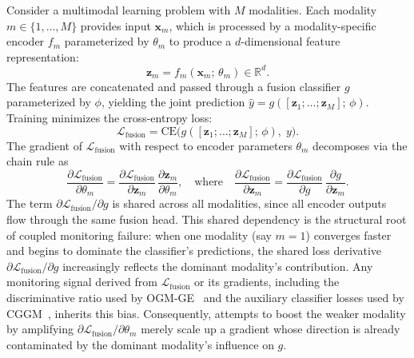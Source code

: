 \documentclass{article}
\newcommand{\loss}{\mathcal{L}}
\newcommand{\encoder}{f}
\begin{document}
Consider a multimodal learning problem with $M$ modalities. Each modality $m \in \{1,\ldots,M\}$ provides input $\mathbf{x}_m$, which is processed by a modality-specific encoder $\encoder_m$ parameterized by $\theta_m$ to produce a $d$-dimensional feature representation:
%
\begin{equation}
\label{eq:encoder}
\mathbf{z}_m = \encoder_m(\mathbf{x}_m;\,\theta_m) \in \mathbb{R}^d.
\end{equation}
%
The features are concatenated and passed through a fusion classifier $g$ parameterized by $\phi$, yielding the joint prediction $\hat{y} = g([\mathbf{z}_1;\ldots;\mathbf{z}_M];\,\phi)$. Training minimizes the cross-entropy loss:
%
\begin{equation}
\label{eq:joint_loss}
\loss_{\text{fusion}} = \mathrm{CE}\!\bigl(g([\mathbf{z}_1;\ldots;\mathbf{z}_M];\,\phi),\; y\bigr).
\end{equation}
%
The gradient of $\loss_{\text{fusion}}$ with respect to encoder parameters $\theta_m$ decomposes via the chain rule as
%
\begin{equation}
\label{eq:gradient_chain}
\frac{\partial \loss_{\text{fusion}}}{\partial \theta_m}
= \frac{\partial \loss_{\text{fusion}}}{\partial \mathbf{z}_m}\,\frac{\partial \mathbf{z}_m}{\partial \theta_m},
\quad\text{where}\quad
\frac{\partial \loss_{\text{fusion}}}{\partial \mathbf{z}_m}
= \frac{\partial \loss_{\text{fusion}}}{\partial g}\,\frac{\partial g}{\partial \mathbf{z}_m}.
\end{equation}
%
The term ${\partial \loss_{\text{fusion}}}/{\partial g}$ is shared across all modalities, since all encoder outputs flow through the same fusion head. This shared dependency is the structural root of coupled monitoring failure: when one modality (say $m{=}1$) converges faster and begins to dominate the classifier's predictions, the shared loss derivative ${\partial \loss_{\text{fusion}}}/{\partial g}$ increasingly reflects the dominant modality's contribution. Any monitoring signal derived from $\loss_{\text{fusion}}$ or its gradients, including the discriminative ratio used by OGM-GE~\citep{peng2022ogmge} and the auxiliary classifier losses used by CGGM~\citep{guo2024cggm}, inherits this bias. Consequently, attempts to boost the weaker modality by amplifying ${\partial \loss_{\text{fusion}}}/{\partial \theta_m}$ merely scale up a gradient whose direction is already contaminated by the dominant modality's influence on $g$.
\end{document}
